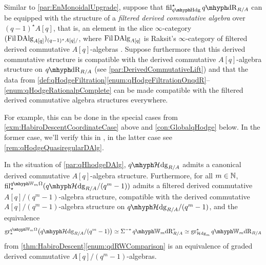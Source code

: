 \documentclass[DIV=12,numbers=enddot,leqno,bibliography=totoc]{scrartcl}
\begin{document}
	\begin{numpar}\label{par:qHhodgeDAlg}
		Similar to \cref{par:EnMonoidalUpgrade}, suppose that $ \fil_{\qHodge}^\star \qdeRham_{R/A}$ can be equipped with the structure of a \emph{filtered derived commutative algebra} over $(q-1)^\star A[q]$, that is, an element in the slice $\infty$-category $( \operatorname{Fil}\operatorname{DAlg}_{A[q]})_{(q-1)^\star A[q]/}$, where $ \operatorname{Fil}\operatorname{DAlg}_{A[q]}$ is Raksit's $\infty$-category of filtered derived commutative $A[q]$-algebras \cite[Definition~]{RaksitFilteredCircle}. Suppose furthermore that this derived commutative structure is compatible with the derived commutative $A[q]$-algebra structure on $\qdeRham_{R/A}$ (see \cref{par:DerivedCommutativeLift}) and that the data from \cref{def:qHodgeFiltration}\cref{enum:qHodgeFiltrationOnqdR}--\cref{enum:qHodgeRationalpComplete} can be made compatible with the filtered derived commutative algebra structures everywhere.
		
		For example, this can be done in the special cases from \cref{exm:HabiroDescentCoordinateCase} above and \cref{con:GlobalqHodge} below. In the former case, we'll verify this in \cite[Remark~]{qdeRhamku}, in the latter case see \cref{rem:qHodgeQuasiregularDAlg}.
	\end{numpar}
	\begin{lem}
		In the situation of \cref{par:qHhodgeDAlg}, $\qHhodge_{R/A}$ admits a canonical derived commutative $A[q]$-algebra structure. Furthermore, for all $m\in\mathbb{N}$, $ \fil_\star^{\qIW_m\Omega}(\qHhodge_{R/A}/(q^m-1))$ admits a filtered derived commutative $A[q]/(q^m-1)$-algebra structure, compatible with the derived commutative $A[q]/(q^m-1)$-algebra structure on $\qHhodge_{R/A}/(q^m-1)$, and the equivalence
		\begin{equation*}
			\gr_*^{\qIW_m\Omega}\bigl(\qHhodge_{R/A}/(q^m-1)\bigr)\simeq \Sigma^{-*}\qIW_m\deRham_{R/A}^*\simeq \gr_{\Hhodge_m}^*\qIW_m\deRham_{R/A}
		\end{equation*}
		from \cref{thm:HabiroDescent}\cref{enum:qdRWComparison} is an equivalence of graded derived commutative $A[q]/(q^m-1)$-algebras.
	\end{lem}
\end{document}
